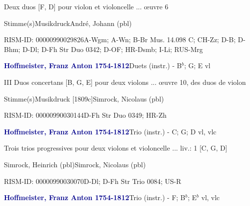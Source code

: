 \documentclass[twocolumn]{book}
\begin{document}
\par \begin{itshape}Deux duos [F, D] pour violon et violoncelle ... œuvre 6\end{itshape} 
\par \textcolor{darkblue}{}  Stimme(s)\newline Musikdruck\newline André, Johann  (pbl)
\par RISM-ID: 00000990029826\newline A-Wgm; A-Wn; B-Br  Mus. 14.098 C; CH-Zz; D-B; D-Bhm; D-Dl; D-Fh  Str Duo 0342; D-OF; HR-Dsmb; I-Li; RUS-Mrg
\par \vspace{7pt} \textcolor{darkblue}{\textbf{Hoffmeister, Franz Anton  1754-1812}}\hfillplus{\textbf{[289]}}\newline Duets (instr.) - B$^b$; G; E vl
\par \begin{itshape}III Duos concertans [B, G, E] pour deux violons ... œuvre 10, des duos de violon\end{itshape} 
\par \textcolor{darkblue}{}  Stimme(s)\newline Musikdruck  [1809c]\newline Simrock, Nicolaus  (pbl)
\par RISM-ID: 00000990030144\newline D-Fh  Str Duo 0349; HR-Zh
\par \vspace{7pt} \textcolor{darkblue}{\textbf{Hoffmeister, Franz Anton  1754-1812}}\hfillplus{\textbf{[290]}}\newline Trio (instr.) - C; G; D vl, vlc
\par \begin{itshape}Trois trios progressives pour deux violons et violoncelle ... liv.: 1 [C, G, D]\end{itshape} \newline Simrock, Heinrich  (pbl)\newline Simrock, Nicolaus  (pbl)
\par RISM-ID: 00000990030070\newline D-Dl; D-Fh  Str Trio 0084; US-R
\par \vspace{7pt} \textcolor{darkblue}{\textbf{Hoffmeister, Franz Anton  1754-1812}}\hfillplus{\textbf{[291]}}\newline Trio (instr.) - F; B$^b$; E$^b$ vl, vlc
\end{document}
